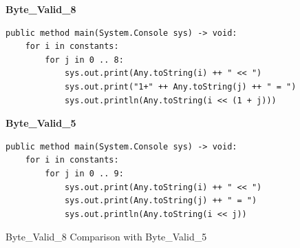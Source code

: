 \begin{figure}[h]
\textbf{Byte\_Valid\_8}
\begin{lstlisting}
public method main(System.Console sys) -> void:
    for i in constants:
        for j in 0 .. 8:
            sys.out.print(Any.toString(i) ++ " << ")
            sys.out.print("1+" ++ Any.toString(j) ++ " = ")
            sys.out.println(Any.toString(i << (1 + j)))
\end{lstlisting}
\textbf{Byte\_Valid\_5}
\begin{lstlisting}
public method main(System.Console sys) -> void:
    for i in constants:
        for j in 0 .. 9:
            sys.out.print(Any.toString(i) ++ " << ")
            sys.out.print(Any.toString(j) ++ " = ")
            sys.out.println(Any.toString(i << j))
\end{lstlisting}
\caption{Byte\_Valid\_8 Comparison with Byte\_Valid\_5}
\label{fig:bytecompare}
\end{figure}